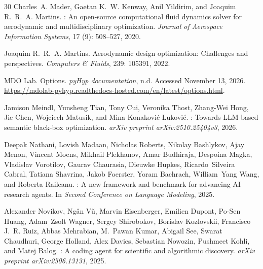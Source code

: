\documentclass{article} %
\begin{document}
\begin{thebibliography}{30}
Charles~A. Mader, Gaetan K.~W. Kenway, Anil Yildirim, and Joaquim R.~R.~A. Martins.
: An open-source computational fluid dynamics solver for aerodynamic and multidisciplinary optimization.
\newblock \emph{Journal of Aerospace Information Systems}, 17 (9): 508--527, 2020.

Joaquim R.~R.~A. Martins.
\newblock Aerodynamic design optimization: Challenges and perspectives.
\newblock \emph{Computers \& Fluids}, 239: 105391, 2022.

MDO Lab.
\newblock Options.
\newblock \emph{pyHyp documentation}, n.d. Accessed November 13, 2026.
\newblock \url{https://mdolab-pyhyp.readthedocs-hosted.com/en/latest/options.html}.

Jamison Meindl, Yunsheng Tian, Tony Cui, Veronika Thost, Zhang-Wei Hong, Jie Chen, Wojciech Matusik, and Mina Konakovi{\'c} Lukovi{\'c}.
: Towards {LLM}-based semantic black-box optimization.
\newblock \emph{arXiv preprint arXiv:2510.25404v3}, 2026.

Deepak Nathani, Lovish Madaan, Nicholas Roberts, Nikolay Bashlykov, Ajay Menon, Vincent Moens, Mikhail Plekhanov, Amar Budhiraja, Despoina Magka, Vladislav Vorotilov, Gaurav Chaurasia, Dieuwke Hupkes, Ricardo~Silveira Cabral, Tatiana Shavrina, Jakob Foerster, Yoram Bachrach, William~Yang Wang, and Roberta Raileanu.
: A new framework and benchmark for advancing {AI} research agents.
\newblock In \emph{Second Conference on Language Modeling}, 2025.

Alexander Novikov, Ng\^{a}n V\~{u}, Marvin Eisenberger, Emilien Dupont, Po-Sen Huang, Adam~Zsolt Wagner, Sergey Shirobokov, Borislav Kozlovskii, Francisco J.~R. Ruiz, Abbas Mehrabian, M.~Pawan Kumar, Abigail See, Swarat Chaudhuri, George Holland, Alex Davies, Sebastian Nowozin, Pushmeet Kohli, and Matej Balog.
: A coding agent for scientific and algorithmic discovery.
\newblock \emph{arXiv preprint arXiv:2506.13131}, 2025.


\end{thebibliography}
\end{document}
